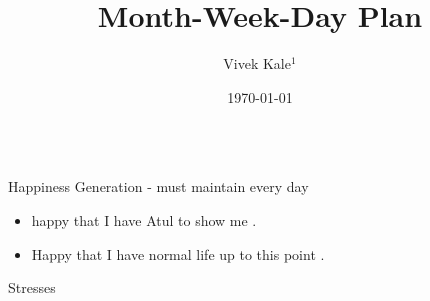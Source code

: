 \documentclass[serif, mathserif, final]{beamer}
\title{Month-Week-Day Plan}
\author{Vivek Kale$^1$}
\institute{$^1$ University of Illinois at Urbana-Champaign}
\date{\today}
\begin{document}
 
\begin{frame}{} 
  \begin{columns}
\begin{column}{0.25\linewidth} %
\begin{block} {Happiness Generation - must maintain every day}
\begin{itemize}
  \tiny \item \tiny happy that I have Atul to show me . 
\item \tiny Happy that I have normal life up to this point . 
\end{itemize} 
\end{block} 
  \begin{block}{ Stresses} 
    \begin{itemize}


\end{itemize}
\end{block}
\end{column}
\end{columns}
\end{frame}
\end{document}
